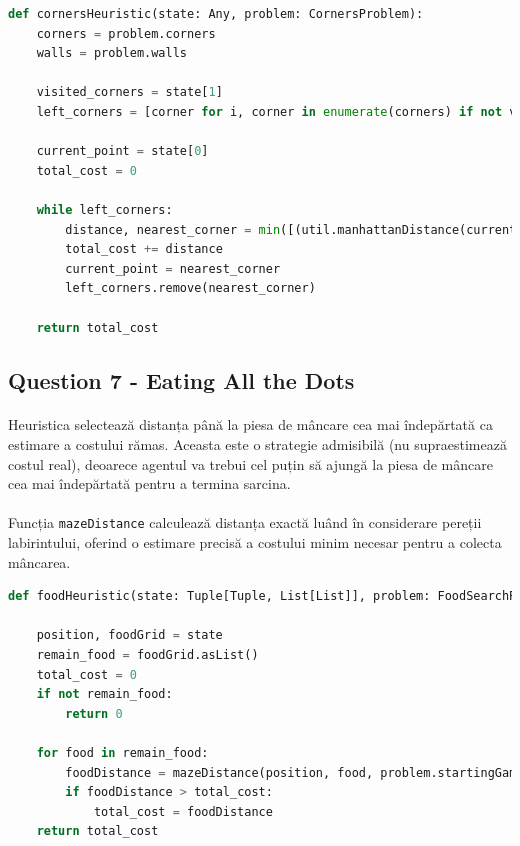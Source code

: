 \documentclass[12pt]{article}
\begin{document}
\begin{lstlisting}[language=Python]
def cornersHeuristic(state: Any, problem: CornersProblem):
    corners = problem.corners
    walls = problem.walls

    visited_corners = state[1]
    left_corners = [corner for i, corner in enumerate(corners) if not visited_corners[i]]

    current_point = state[0]
    total_cost = 0

    while left_corners:
        distance, nearest_corner = min([(util.manhattanDistance(current_point, corner), corner) for corner in left_corners])
        total_cost += distance
        current_point = nearest_corner
        left_corners.remove(nearest_corner)

    return total_cost
\end{lstlisting}


	\subsection{Question 7 - Eating All the Dots}
\paragraph{}Heuristica selectează distanța până la piesa de mâncare cea mai îndepărtată ca estimare a costului rămas. Aceasta este o strategie admisibilă (nu supraestimează costul real), deoarece agentul va trebui cel puțin să ajungă la piesa de mâncare cea mai îndepărtată pentru a termina sarcina. \paragraph{}Funcția \texttt{mazeDistance} calculează distanța exactă luând în considerare pereții labirintului, oferind o estimare precisă a costului minim necesar pentru a colecta mâncarea.

\begin{lstlisting}[language=Python]
def foodHeuristic(state: Tuple[Tuple, List[List]], problem: FoodSearchProblem):

    position, foodGrid = state
    remain_food = foodGrid.asList()
    total_cost = 0
    if not remain_food:
        return 0

    for food in remain_food:
        foodDistance = mazeDistance(position, food, problem.startingGameState)
        if foodDistance > total_cost:
            total_cost = foodDistance
    return total_cost
\end{lstlisting}
\end{document}
